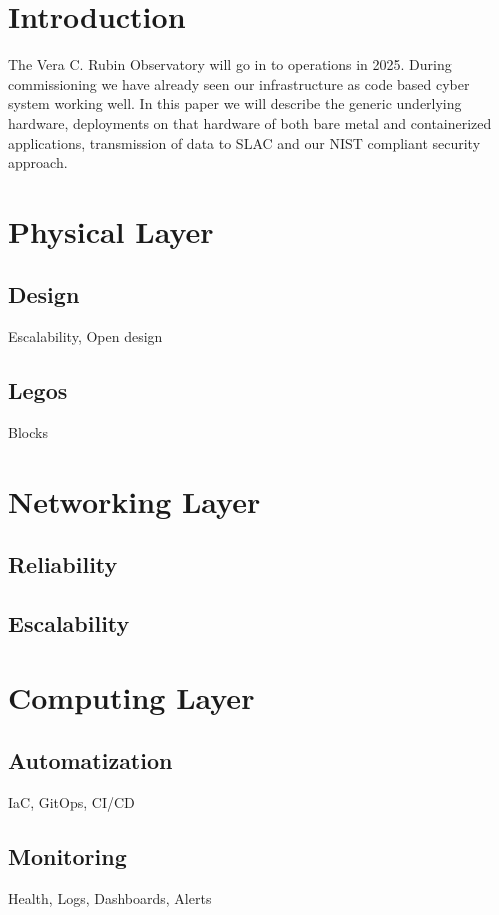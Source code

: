 \section{Introduction}

The Vera C. Rubin Observatory\cite{2019ApJ...873..111I} will go in to operations in 2025.
During commissioning we have already seen our infrastructure as code based cyber system working well.
In this paper we will describe the generic underlying hardware, deployments on that hardware of both bare metal and containerized applications, transmission of data to SLAC and our NIST\cite{NIST.SP.800-171r3} compliant security approach.

\section{Physical Layer}

\subsection{Design}
Escalability, Open design

\subsection{Legos}
Blocks

\section{Networking Layer}

\subsection{Reliability}

\subsection{Escalability}

\section{Computing Layer}

\subsection{Automatization}
IaC, GitOps, CI/CD

\subsection{Monitoring}
Health, Logs, Dashboards, Alerts

